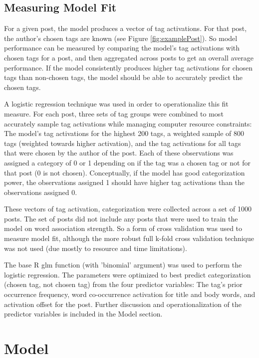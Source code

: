 \documentclass[10pt,letterpaper]{article}
\begin{document}
\subsection{Measuring Model Fit}

For a given post, the model produces a vector of tag activations.
For that post, the author's chosen tags are known (see Figure \ref{fig:examplePost}).
So model performance can be measured by comparing the model's tag activations with chosen tags for a post, and then aggregated across posts to get an overall average performance.
If the model consistently produces higher tag activations for chosen tags than non-chosen tags, the model should be able to accurately predict the chosen tags.

A logistic regression technique was used in order to operationalize this fit measure.
For each post, three sets of tag groups were combined to most accurately sample tag activations while managing computer resource constraints:
The model's tag activations for the highest 200 tags, a weighted sample of 800 tags (weighted towards higher activation), and the tag activations for all tags that were chosen by the author of the post.
Each of these observations was assigned a category of 0 or 1 depending on if the tag was a chosen tag or not for that post (0 is not chosen).
Conceptually, if the model has good categorization power, the observations assigned 1 should have higher tag activations than the observations assigned 0.

These vectors of tag activation, categorization were collected across a set of \num{1000} posts.
The set of posts did not include any posts that were used to train the model on word association strength.
So a form of cross validation was used to measure model fit, although the more robust full k-fold cross validation technique was not used (due mostly to resource and time limitations).

The base R glm function (with 'binomial' argument) was used to perform the logistic regression.
The parameters were optimized to best predict categorization (chosen tag, not chosen tag) from the four predictor variables:
The tag's prior occurrence frequency, word co-occurrence activation for title and body words, and activation offset for the post.
Further discussion and operationalization of the predictor variables is included in the Model section.

\section{Model}
\end{document}
